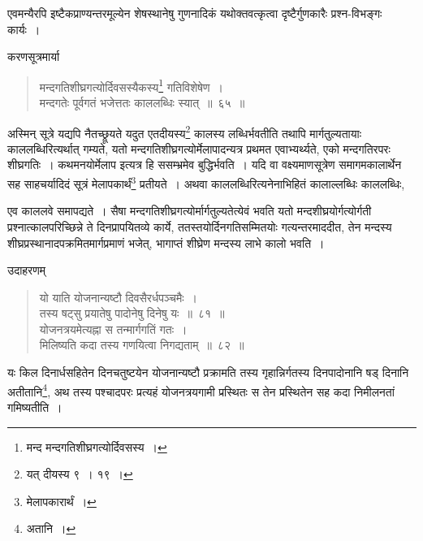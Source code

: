 \documentclass[10pt, openany]{book}
\begin{document}
{{{{एवमन्यैरपि इष्टैकप्राण्यन्तरमूल्येन शेषस्थानेषु गुणनादिकं
यथोक्तवत्कृत्वा दृष्टैर्गुणकारैः}
{प्रश्न-विभङ्गः कार्यः~।}
\vspace{3mm} 

{करणसूत्रमार्या\textemdash}

\begin{quote}
{\bs मन्दगतिशीघ्रगत्योर्दिवसस्यैकस्य\renewcommand{\thefootnote}{\s २}\footnote{\s मन्द मन्दगतिशीघ्रगत्योर्दिवसस्य~।}  गतिविशेषेण~। \\
 मन्दगतेः पूर्वगतं भजेत्ततः काललब्धिः स्यात्~॥~६५~॥}
\end{quote}
 
 {अस्मिन् सूत्रे यद्यपि नैतच्छ्रूयते यदुत एतदीयस्य\renewcommand{\thefootnote}{\s ३}\footnote{\s यत्
दीयस्य ९~। १९~।}  कालस्य
लब्धिर्भवतीति तथापि}
{मार्गतुल्यतायाः काललब्धिरित्यर्थात् गम्यते, यतो
मन्दगतिशीघ्रगत्योर्मेलापादन्यत्र प्रथमत}
{एवाभ्यर्थ्यते, एको मन्दगतिरपरः शीघ्रगतिः~। कथमनयोर्मेलाप इत्यत्र हि
ससम्भ्रमेव}
{बुद्धिर्भवति~। यदि वा वक्ष्यमाणसूत्रेण समागमकालार्थेन सह साहचर्यादिदं
सूत्रं मेलापकार्थं\renewcommand{\thefootnote}{\s ४}\footnote{\s मेलापकारार्थं~।} प्रतीयते~। अथवा काललब्धिरित्यनेनाभिहितं कालाल्लब्धिः काललब्धिः,}


\newpage

{एव काललवे समापद्यते~। सैषा मन्दगतिशीघ्रगत्योर्मार्गतुल्यतेत्येवं भवति
यतो मन्दशीघ्रयोर्गत्योर्गती प्रश्नात्कालपरिच्छिन्ने ते दिनप्रापयितव्ये कार्ये,
ततस्तयोर्दिनगतिसम्मितयोः गत्यन्तरमाददीत,}
{तेन मन्दस्य शीघ्रप्रस्थानादपक्रमितमार्गप्रमाणं भजेत्, भागाप्तं शीघ्रेण
मन्दस्य लाभे कालो}
{भवति~।}

\vspace{3mm}
{उदाहरणम्\textemdash}
  
\begin{quote}
{\eg यो याति योजनान्यष्टौ दिवसैरर्धपञ्चमैः~। \\
 तस्य षट्सु प्रयातेषु पादोनेषु दिनेषु यः~॥~८१~॥\\ 
 योजनत्रयमेत्यह्ना स तन्मार्गगतिं गतः~। \\
 मिलिष्यति कदा तस्य गणयित्वा निगद्यताम्~॥~८२~॥}
\end{quote}
 
{यः किल दिनार्धसहितेन दिनचतुष्टयेन योजनान्यष्टौ प्रक्रामति तस्य
गृहान्निर्गतस्य}
{दिनपादोनानि षड् दिनानि अतीतानि\renewcommand{\thefootnote}{\s २}\footnote{\s अतानि~।}, अथ तस्य पश्चादपरः प्रत्यहं
योजनत्रयगामी प्रस्थितः}
{स तेन प्रस्थितेन सह कदा निमीलनतां गमिष्यतीति~।}
\vspace{3mm}

}}}
\end{document}
